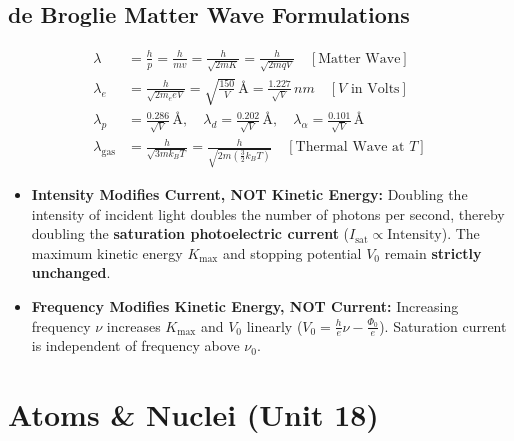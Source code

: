 \documentclass[10pt,twoside,openright]{book}
\begin{document}
\subsection{de Broglie Matter Wave Formulations}

\begin{formulabox}
\begin{align}
  \lambda &= \frac{h}{p} = \frac{h}{mv} = \frac{h}{\sqrt{2mK}} = \frac{h}{\sqrt{2mqV}} \quad [\text{Matter Wave}] \\
  \lambda_{e} &= \frac{h}{\sqrt{2m_e e V}} = \sqrt{\frac{150}{V}}\,\text{\AA} = \frac{1.227}{\sqrt{V}}\,\si{nm} \quad [V\text{ in Volts}] \\
  \lambda_{p} &= \frac{0.286}{\sqrt{V}}\,\text{\AA}, \quad \lambda_{d} = \frac{0.202}{\sqrt{V}}\,\text{\AA}, \quad \lambda_{\alpha} = \frac{0.101}{\sqrt{V}}\,\text{\AA} \\
  \lambda_{\text{gas}} &= \frac{h}{\sqrt{3m k_B T}} = \frac{h}{\sqrt{2m(\frac{3}{2}k_B T)}} \quad [\text{Thermal Wave at } T]
\end{align}
\end{formulabox}

\begin{trapbox}
\begin{itemize}
  \item \textbf{Intensity Modifies Current, NOT Kinetic Energy:} Doubling the intensity of incident light doubles the number of photons per second, thereby doubling the \textbf{saturation photoelectric current} ($I_{\text{sat}} \propto \text{Intensity}$). The maximum kinetic energy $K_{\max}$ and stopping potential $V_0$ remain \textbf{strictly unchanged}.
  \item \textbf{Frequency Modifies Kinetic Energy, NOT Current:} Increasing frequency $\nu$ increases $K_{\max}$ and $V_0$ linearly ($V_0 = \frac{h}{e}\nu - \frac{\Phi_0}{e}$). Saturation current is independent of frequency above $\nu_0$.
\end{itemize}
\end{trapbox}

\newpage

\section{Atoms \& Nuclei (Unit 18)}
\end{document}
